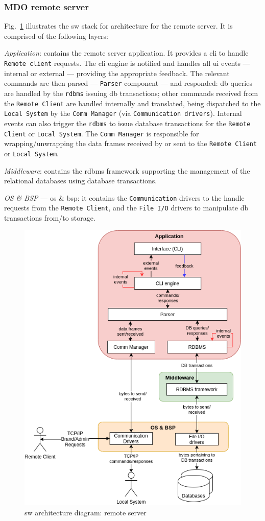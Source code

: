 \subsubsection{MDO remote server}
\label{sec:mdo-remote-server-1}
%
Fig.~\ref{fig:sw-arch-rs} illustrates the \gls{sw} stack for architecture for
the remote server.
It is comprised of the following layers:
\begin{item-c}
\item \emph{Application}: contains the remote server application. It provides a
  \gls{cli} to handle \texttt{Remote client} requests.  The \gls{cli} engine
  is notified and handles all \gls{ui} events --- internal or external ---
  providing the appropriate feedback. The relevant commands
  are then parsed --- \texttt{Parser} component --- and responded: \gls{db}
  queries are handled by the \texttt{\gls{rdbms}} issuing \gls{db} transactions;
  other commands received from the \texttt{Remote Client} are handled internally
  and translated, being dispatched to the \texttt{Local
    System} by the \texttt{Comm Manager}  (via \texttt{Communication drivers}). Internal events can also
  trigger the \texttt{\gls{rdbms}} to issue database transactions for the
  \texttt{Remote Client} or \texttt{Local System}.
  The \texttt{Comm Manager} is responsible for wrapping\slash unwrapping the data
  frames received by or sent to the \texttt{Remote Client} or \texttt{Local System}.
\item \emph{Middleware}: contains the \gls{rdbms} framework supporting the
  management of the relational databases using database transactions.
\item \emph{OS \& BSP} --- \gls{os} \& \gls{bsp}: it contains the \texttt{Communication}
  drivers to the handle requests from the \texttt{Remote Client}, and the
  \texttt{File I/O} drivers to manipulate \gls{db} transactions from\slash to storage.
\end{item-c}
%
\begin{figure}[htb!]
\centering
    \includegraphics[width=0.55\columnwidth]{./img/sw-arch-rs.png}
  \caption{\gls{sw} architecture diagram: remote server}%
\label{fig:sw-arch-rs}
\end{figure}
%
